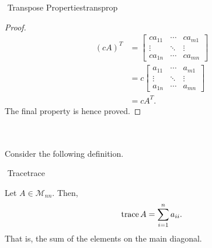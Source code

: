 \begin{theorem}{\Stop\,\,Transpose Properties}{transprop}
\begin{proof}
\begin{align*}
                    (cA)^T&=\begin{bmatrix} ca_{11} & \cdots & ca_{m1} \\ \vdots & \ddots & \vdots \\
                    ca_{1n} & \cdots & ca_{mn} \end{bmatrix} \\
                    &=c\begin{bmatrix} a_{11} & \cdots & a_{m1} \\ \vdots & \ddots & \vdots \\
                    a_{1n} & \cdots & a_{mn} \end{bmatrix} \\
                    &=cA^T.
                \end{align*}
                The final property is hence proved.
            \end{proof}
        
        \end{theorem}
        \vphantom
        \\
        \\
        Consider the following definition.
        \begin{definition}{\Stop\,\,Trace}{trace}
            
            Let \(A\in\mathcal{M}_{nn}\). Then,
            \begin{equation*}
                \text{trace\,} A=\sum_{i=1}^na_{ii}.
            \end{equation*}
            That is, the sum of the elements on the main diagonal.
            
        \end{definition}
        \pagebreak
